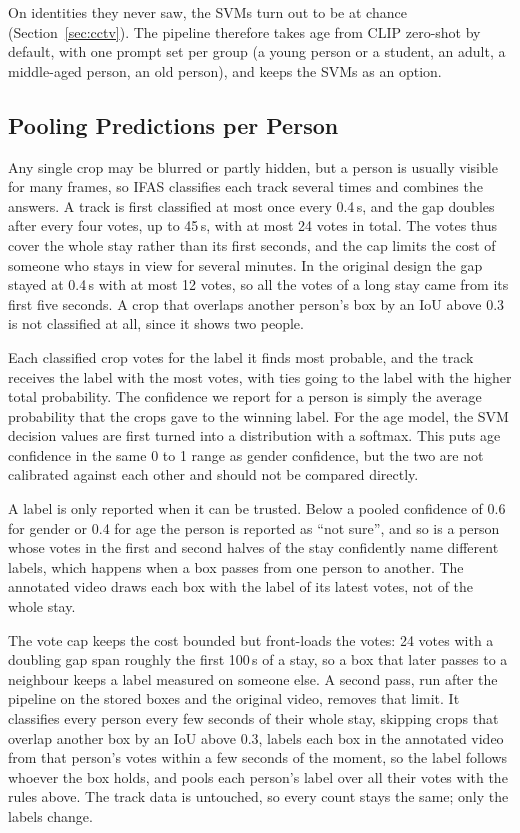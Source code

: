 \documentclass[conference]{IEEEtran}
\begin{document}
On identities they never saw, the SVMs turn out to be at chance
(Section~\ref{sec:cctv}). The pipeline therefore takes age from CLIP zero-shot by
default, with one prompt set per group (a young person or a student, an adult, a
middle-aged person, an old person), and keeps the SVMs as an option.

\subsection{Pooling Predictions per Person}
\label{sec:pooling}
Any single crop may be blurred or partly hidden, but a person is usually visible
for many frames, so IFAS classifies each track several times and combines the
answers. A track is first classified at most once every 0.4\,s, and the gap
doubles after every four votes, up to 45\,s, with at most 24 votes in total. The
votes thus cover the whole stay rather than its first seconds, and the cap
limits the cost of someone who stays in view for several minutes. In the
original design the gap stayed at 0.4\,s with at most 12 votes, so all the votes
of a long stay came from its first five seconds. A crop that overlaps another
person's box by an IoU above 0.3 is not classified at all, since it shows two
people.

Each classified crop votes for the label it finds most probable, and the track
receives the label with the most votes, with ties going to the label with the
higher total probability. The confidence we report for a person is simply the
average probability that the crops gave to the winning label. For the age model,
the SVM decision values are first turned into a distribution with a softmax. This
puts age confidence in the same 0 to 1 range as gender confidence, but the two are
not calibrated against each other and should not be compared directly.

A label is only reported when it can be trusted. Below a pooled confidence of 0.6
for gender or 0.4 for age the person is reported as ``not sure'', and so is a
person whose votes in the first and second halves of the stay confidently name
different labels, which happens when a box passes from one person to another.
The annotated video draws each box with the label of its latest votes, not of
the whole stay.

The vote cap keeps the cost bounded but front-loads the votes: 24 votes with a
doubling gap span roughly the first 100\,s of a stay, so a box that later passes
to a neighbour keeps a label measured on someone else. A second pass, run after
the pipeline on the stored boxes and the original video, removes that limit. It
classifies every person every few seconds of their whole stay, skipping crops
that overlap another box by an IoU above 0.3, labels each box in the annotated
video from that person's votes within a few seconds of the moment, so the label
follows whoever the box holds, and pools each person's label over all their
votes with the rules above. The track data is untouched, so every count stays
the same; only the labels change.
\end{document}
